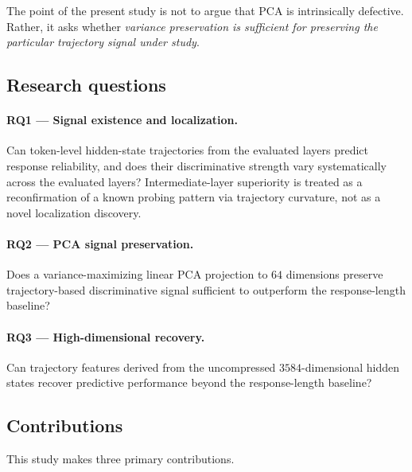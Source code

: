 \documentclass{article}
\begin{document}
The point of the present study is not to argue that {PCA} is intrinsically defective. Rather, it asks whether \emph{variance preservation is sufficient for preserving the particular trajectory signal under study}.

\subsection{Research questions}
\label{sec:rqs}

\paragraph{{RQ1} --- Signal existence and localization.}
Can token-level hidden-state trajectories from the evaluated layers predict response reliability, and does their discriminative strength vary systematically across the evaluated layers? Intermediate-layer superiority is treated as a reconfirmation of a known probing pattern via trajectory curvature, not as a novel localization discovery.

\paragraph{{RQ2} --- {PCA} signal preservation.}
Does a variance-maximizing linear {PCA} projection to $64$ dimensions preserve trajectory-based discriminative signal sufficient to outperform the response-length baseline?

\paragraph{{RQ3} --- High-dimensional recovery.}
Can trajectory features derived from the uncompressed $3584$-dimensional hidden states recover predictive performance beyond the response-length baseline?

\subsection{Contributions}
\label{sec:contrib}

This study makes three primary contributions.
\end{document}
